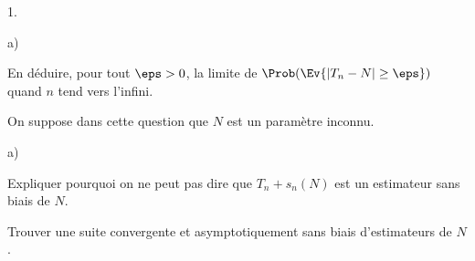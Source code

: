 \begin{exerciceAP}
\begin{noliste}{1.}
\begin{noliste}{a)}
      \item En déduire, pour tout $\eps>0$, la limite de 
      $\Prob(\Ev{\vert T_n - N \vert \geq \eps})$ quand $n$ tend 
      vers l'infini.
    \end{noliste}
    
    \item On suppose dans cette question que $N$ est un paramètre 
    inconnu.
    \begin{noliste}{a)}
    \setlength{\itemsep}{2mm}
      \item Expliquer pourquoi on ne peut pas dire que $T_n + s_n(N)$
      est un estimateur sans biais de $N$.
      
      \item Trouver une suite convergente et asymptotiquement sans 
      biais d'estimateurs de $N$.
    \end{noliste}
  \end{noliste}
\end{exerciceAP} 


